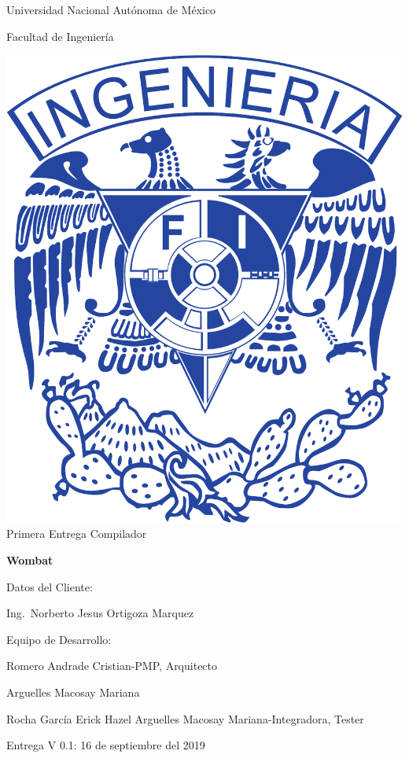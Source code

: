 \documentclass{article}
\begin{document}
\begin{titlepage}
  \begin{center}
    \Huge{Universidad Nacional Autónoma de México}

    \Huge{Facultad de Ingeniería}
    \vfill

    \includegraphics[scale=.3]{../img/UNAM_INGENIERIA}
    \vfill
    \Large{Primera Entrega Compilador}

    
    \vfill
    \LARGE{\textbf{Wombat}}
    \vfill
  \end{center}  

  \Large{Datos del Cliente:
    
    \hspace{2cm}} Ing.\ Norberto Jesus Ortigoza Marquez
  \vfill
  
  \Large{Equipo de Desarrollo:
    
    \hspace{2cm}Romero Andrade Cristian\hfill -\hfill PMP, Arquitecto
    
    \hspace{2cm}Arguelles Macosay Mariana
    
    \hspace{2cm}Rocha García Erick Hazel
    \hspace{2cm}Arguelles Macosay Mariana\hfill -\hfill Integradora, Tester}
  \vfill
  \Large{Entrega V 0.1: 16 de septiembre del 2019}
  

  
  
\end{titlepage}
\end{document}
